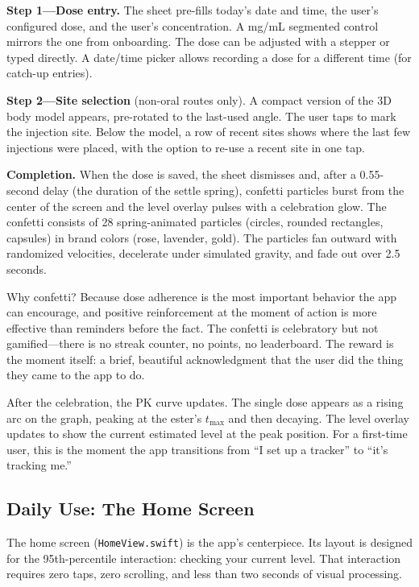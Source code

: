\documentclass[11pt,a4paper]{article}
\newcommand{\code}[1]{\texttt{\small #1}}
\begin{document}
\textbf{Step 1---Dose entry.} The sheet pre-fills today's date and time,
the user's configured dose, and the user's concentration. A mg/mL
segmented control mirrors the one from onboarding. The dose can be
adjusted with a stepper or typed directly. A date/time picker allows
recording a dose for a different time (for catch-up entries).

\textbf{Step 2---Site selection} (non-oral routes only). A compact version
of the 3D body model appears, pre-rotated to the last-used angle. The
user taps to mark the injection site. Below the model, a row of recent
sites shows where the last few injections were placed, with the option to
re-use a recent site in one tap.

\textbf{Completion.} When the dose is saved, the sheet dismisses and,
after a 0.55-second delay (the duration of the settle spring), confetti
particles burst from the center of the screen and the level overlay pulses
with a celebration glow. The confetti consists of 28 spring-animated
particles (circles, rounded rectangles, capsules) in brand colors
(rose, lavender, gold). The particles fan outward with randomized
velocities, decelerate under simulated gravity, and fade out over 2.5
seconds.

Why confetti? Because dose adherence is the most important behavior the
app can encourage, and positive reinforcement at the moment of action is
more effective than reminders before the fact. The confetti is
celebratory but not gamified---there is no streak counter, no points, no
leaderboard. The reward is the moment itself: a brief, beautiful
acknowledgment that the user did the thing they came to the app to do.

After the celebration, the PK curve updates. The single dose appears as a
rising arc on the graph, peaking at the ester's $t_{\max}$ and then
decaying. The level overlay updates to show the current estimated level
at the peak position. For a first-time user, this is the moment the app
transitions from ``I set up a tracker'' to ``it's tracking me.''

\subsection{Daily Use: The Home Screen}
\label{sec:home_screen}

The home screen (\code{HomeView.swift}) is the app's centerpiece. Its
layout is designed for the 95th-percentile interaction: checking your
current level. That interaction requires zero taps, zero scrolling, and
less than two seconds of visual processing.
\end{document}

